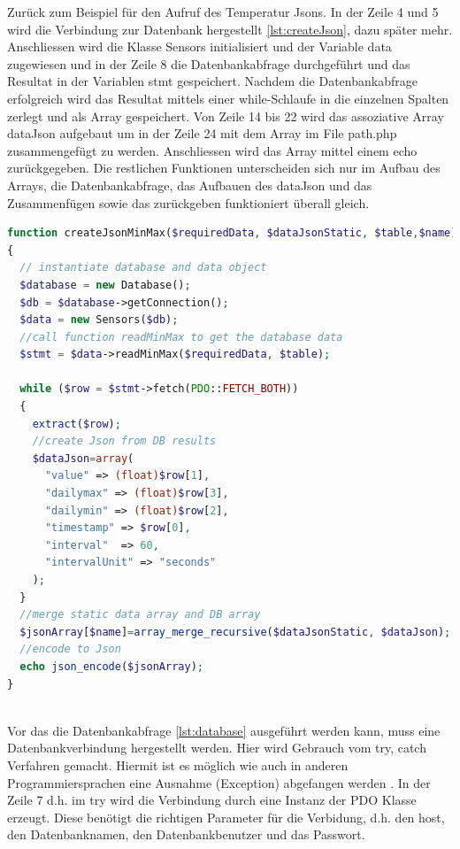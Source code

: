 Zurück zum Beispiel für den Aufruf des Temperatur Jsons. In der Zeile 4 und 5 wird die Verbindung zur Datenbank hergestellt \ref{lst:createJson}, dazu später mehr. Anschliessen wird die Klasse Sensors initialisiert und der Variable data zugewiesen und in der Zeile 8 die Datenbankabfrage durchgeführt und das Resultat in der Variablen stmt gespeichert. Nachdem die Datenbankabfrage erfolgreich wird das Resultat mittels einer while-Schlaufe in die einzelnen Spalten zerlegt und als Array gespeichert. Von Zeile 14 bis 22 wird das assoziative Array dataJson aufgebaut um in der Zeile 24 mit dem Array im File path.php zusammengefügt zu werden. Anschliessen wird das Array mittel einem echo zurückgegeben. Die restlichen Funktionen unterscheiden sich nur im Aufbau des Arrays, die Datenbankabfrage, das Aufbauen des dataJson und das Zusammenfügen sowie das zurückgeben funktioniert überall gleich.

\begin{lstlisting}[label=lst:createJson,caption=Beispiel erstellung des Jsons, language=php, style=php]
function createJsonMinMax($requiredData, $dataJsonStatic, $table,$name)
{
  // instantiate database and data object
  $database = new Database();
  $db = $database->getConnection();
  $data = new Sensors($db);
  //call function readMinMax to get the database data
  $stmt = $data->readMinMax($requiredData, $table);

  while ($row = $stmt->fetch(PDO::FETCH_BOTH))
  {
    extract($row);
    //create Json from DB results
    $dataJson=array(
      "value" => (float)$row[1],
      "dailymax" => (float)$row[3],
      "dailymin" => (float)$row[2],
      "timestamp" => $row[0],
      "interval"  => 60,
      "intervalUnit" => "seconds"
    );
  }
  //merge static data array and DB array
  $jsonArray[$name]=array_merge_recursive($dataJsonStatic, $dataJson);
  //encode to Json
  echo json_encode($jsonArray);
}



\end{lstlisting}
Vor das die Datenbankabfrage \ref{lst:database} ausgeführt werden kann, muss eine Datenbankverbindung hergestellt werden. Hier wird Gebrauch vom try, catch Verfahren gemacht. Hiermit ist es möglich wie auch in anderen Programmiersprachen eine Ausnahme (Exception) abgefangen werden \cite{Ausnahmebehandlung:ThePHPGroup}. In der Zeile 7 d.h. im try wird die Verbindung durch eine Instanz der PDO Klasse erzeugt. Diese benötigt die richtigen Parameter für die Verbidung, d.h. den host, den Datenbanknamen, den Datenbankbenutzer und das Passwort.

